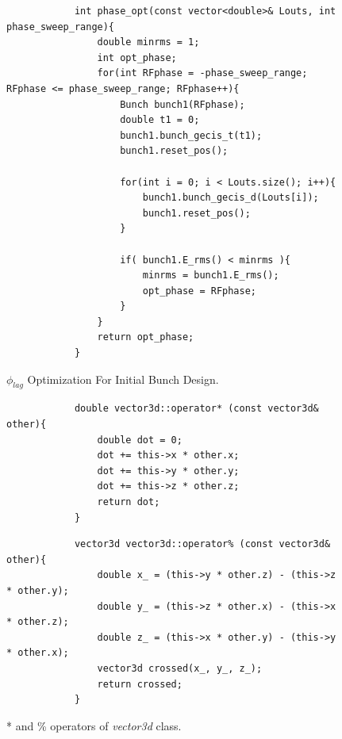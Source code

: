 \documentclass[a4paper,oneside,12pt]{report}
\numberwithin{equation}{chapter}
\begin{document}
\begin{figure}[H]
        \centering
        \begin{verbatim}
            int phase_opt(const vector<double>& Louts, int phase_sweep_range){
                double minrms = 1;
                int opt_phase;
                for(int RFphase = -phase_sweep_range; RFphase <= phase_sweep_range; RFphase++){
                    Bunch bunch1(RFphase);
                    double t1 = 0;
                    bunch1.bunch_gecis_t(t1);
                    bunch1.reset_pos();
            
                    for(int i = 0; i < Louts.size(); i++){
                        bunch1.bunch_gecis_d(Louts[i]);
                        bunch1.reset_pos();
                    }
                        
                    if( bunch1.E_rms() < minrms ){
                        minrms = bunch1.E_rms();
                        opt_phase = RFphase;
                    }
                }
                return opt_phase;
            }
        \end{verbatim}
    \vspace{20pt}
    \caption{$\phi_{lag}$ Optimization For Initial Bunch Design.}
    \label{fig:phlag_opt_n_pass}
\end{figure}
\vspace{20pt}
\begin{figure}[H]
    \begin{minipage}{\textwidth}
        \begin{verbatim}
            double vector3d::operator* (const vector3d& other){
                double dot = 0;
                dot += this->x * other.x;
                dot += this->y * other.y;
                dot += this->z * other.z;
                return dot;
            }
        \end{verbatim}
    \end{minipage}
    \vspace{10pt}
    \begin{minipage}{\textwidth}
        \begin{verbatim}
            vector3d vector3d::operator% (const vector3d& other){
                double x_ = (this->y * other.z) - (this->z * other.y);
                double y_ = (this->z * other.x) - (this->x * other.z);
                double z_ = (this->x * other.y) - (this->y * other.x);
                vector3d crossed(x_, y_, z_);
                return crossed;
            }
        \end{verbatim}
    \end{minipage}
    \vspace{20pt}
    \caption{* and \% operators of \textit{vector3d} class.}
    \label{fig:vector3d_dot_cross_product}
\end{figure}
\end{document}

